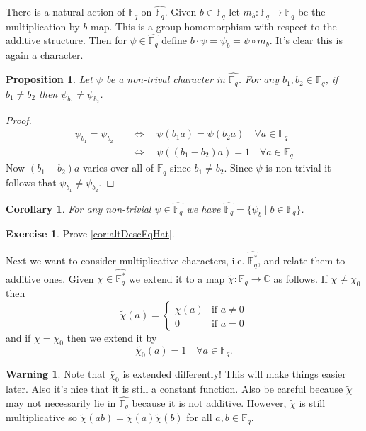 \documentclass[11pt]{article}
\newcommand{\BB}[1]{\mathbb{#1}} %
\newcommand{\CC}{\BB{C}}
\newcommand{\FF}{\BB{F}}
\newcommand{\st}{\mid}
\renewcommand{\hat}{\widehat}
\theoremstyle{plain}
\newtheorem{prop}[propositioncounter]{Proposition}
\newtheorem{cor}[corollarycounter]{Corollary}
\theoremstyle{definition}
\newtheorem{excer}[exercisecounter]{Exercise}
\newtheorem{warn}[warniningcounter]{Warning}
\theoremstyle{remark}
\begin{document}
There is a natural action of $\FF_q$ on $\hat{\FF_q}$. Given $b\in \FF_q$ let $m_b:\FF_q\to \FF_q$ be the multiplication by $b$ map. This is a group homomorphism with respect to the additive structure. Then for $\psi\in\hat{\FF_q}$ define $b\cdot\psi = \psi_b = \psi\circ m_b$. It's clear this is again a character.

\begin{prop}
	 Let $\psi$ be a non-trival character in $\hat{\FF_q}$. For any $b_1,b_2\in\FF_q$, if $b_1\neq b_2$ then $\psi_{b_1}\neq \psi_{b_2}$.
\end{prop}
\begin{proof}
	\begin{align*}
		\psi_{b_1} = \psi_{b_2} \quad&\Leftrightarrow\quad \psi(b_1a) = \psi(b_2a) \quad\forall a\in\FF_q
		\\
		&\Leftrightarrow\quad \psi((b_1 - b_2)a) = 1 \quad\forall a\in\FF_q
	\end{align*}
	Now $(b_1 - b_2)a$ varies over all of $\FF_q$ since $b_1\neq b_2$. Since $\psi$ is non-trivial it follows that $\psi_{b_1}\neq\psi_{b_2}$.
\end{proof}

\begin{cor}\label{cor:altDescFqHat}
	For any non-trivial $\psi\in\hat{\FF_q}$ we have $\hat{\FF_q} = \{\psi_b \st b\in\FF_q \}$.
\end{cor}
\begin{excer}
	Prove \autoref{cor:altDescFqHat}.
\end{excer}

Next we want to consider multiplicative characters, i.e. $\hat{\FF_q^*}$, and relate them to additive ones. Given $\chi\in\hat{\FF_q^*}$ we extend it to a map $\widetilde{\chi}:\FF_q \to \CC$ as follows. If $\chi\neq\chi_0$ then
$$
\widetilde{\chi}(a) =
\begin{cases}
	\chi(a) &\text{if $a\neq 0$}
	\\
	0 &\text{if $a=0$}
\end{cases}
$$
and if $\chi = \chi_0$ then we extend it by
$$
\widetilde{\chi_0}(a) = 1 \quad \forall a\in\FF_q.
$$

\begin{warn}\label{warn:extensionsOfChars}
	Note that $\widetilde{\chi_0}$ is extended differently! This will make things easier later. Also it's nice that it is still a constant function. Also be careful because $\widetilde{\chi}$ may not necessarily lie in $\hat{\FF_q}$ because it is not additive. However, $\widetilde{\chi}$ is still multiplicative so $\widetilde{\chi}(ab) = \widetilde{\chi}(a)\widetilde{\chi}(b)$ for all $a,b\in\FF_q$.
\end{warn}
\end{document}
